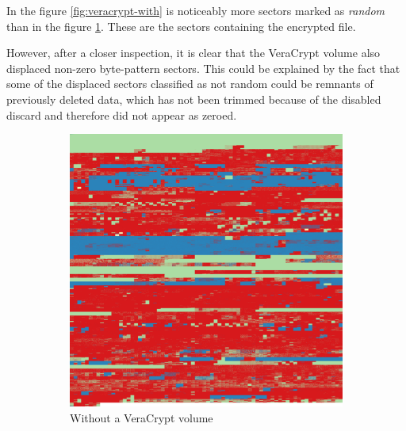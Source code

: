 \documentclass[
  digital, %
  color,   %
  oneside, %
  lof,     %
  nolot,     %
]{fithesis4}
\begin{document}
In the figure \ref{fig:veracrypt-with} is noticeably more sectors marked as \emph{random} than in the figure \ref{fig:veracrypt-without}.
These are the sectors containing the encrypted file. 

However, after a closer inspection, it is clear that the VeraCrypt volume also displaced non-zero byte-pattern sectors.
This could be explained by the fact that some of the displaced sectors classified as not random could be remnants of previously deleted data, which has not been trimmed because of the disabled discard and therefore did not appear as zeroed.

\begin{figure}
  \centering
  \begin{subfigure}[t]{.45\textwidth}
    \centering
    \includegraphics[width=\textwidth,interpolate=false]{ubnt-unencrypted-chi2-4-sweeping-blocks.png}
    \caption{Without a VeraCrypt volume}
    \label{fig:veracrypt-without}
  \end{subfigure}
  \hfill
  \begin{subfigure}[t]{.45\textwidth}
    \centering

\end{subfigure}
\end{figure}
\end{document}
